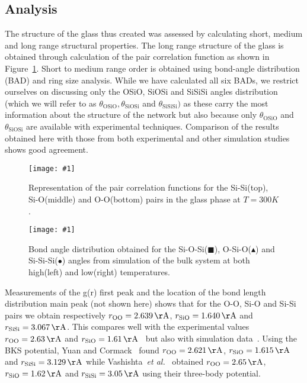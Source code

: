 \documentclass[aps,10pt,twocolumn]{revtex4}
\makeatletter
\newcommand{\etal}{\emph{et al.}\@\xspace}
\newcommand{\mrm}[1]{\ensuremath{\mathrm{#1}}\xspace}
\newlength{\picW}	%
\newcommand{\picA}{270}	%
\newcommand{\picL}[1]{\texttt{[image: \#1]}}
\newcommand{\angstrom}{\ensuremath{\mrm{\AA}}\xspace}
\makeatother
\begin{document}
\subsection{Analysis}

The structure of the glass thus created was assessed by calculating short, medium and long range
structural properties. The long range structure of the glass is obtained
through calculation of the pair correlation function as shown in Figure~\ref{fig:mkGlass_gr}.
Short to medium range order is obtained using bond-angle distribution (BAD) and ring size
analysis. 
While we have calculated all six BADs, we restrict ourselves on
discussing only the OSiO, SiOSi and SiSiSi angles distribution (which we will refer to as
$\theta_\mrm{OSiO},\theta_\mrm{SiOSi}$ and $\theta_\mrm{SiSiSi})$ as these carry the most
information about the structure of the network but also because only $\theta_\mrm{OSiO}$ and
$\theta_\mrm{SiOSi}$ are available with experimental techniques.  Comparison of the results
obtained here with those from both experimental and other simulation studies shows good
agreement.\\  

\picW=8cm
\begin{figure}
\picL{fig02.ps}
\caption{Representation of the pair correlation functions for the Si-Si(top), Si-O(middle) and
O-O(bottom) pairs in the glass phase at $T=300K$.}
\label{fig:mkGlass_gr}
\end{figure}

\picW=8cm
\begin{figure}
\picL{fig03.ps}
\caption{Bond angle distribution obtained for the Si-O-Si($\blacksquare$), O-Si-O($\blacktriangle$) and Si-Si-Si($\bullet$) angles from
simulation of the bulk system at both high(left) and low(right) temperatures.}
\end{figure}

Measurements of the g(r) first peak and the location of the bond length distribution main peak (not
shown here) shows that for the O-O, Si-O and Si-Si pairs we obtain respectively
$r_\mrm{OO}=2.639\,\angstrom$, $r_\mrm{SiO}=1.640\,\angstrom$ and $r_\mrm{SiSi}=3.067\,\angstrom$. 
This compares well with the experimental values 
$r_\mrm{OO}=2.63\,\angstrom$ and $r_\mrm{SiO}=1.61\,\angstrom$~\cite{MozziWarren69,JohnsonWright83} but also
with simulation data~\cite{YuanCormack01,VashishtaKalia90}. Using the BKS potential, Yuan and
Cormack~\cite{YuanCormack01} found $r_\mrm{OO}=2.621\,\angstrom$, $r_\mrm{SiO}=1.615\,\angstrom$ and
$r_\mrm{SiSi}=3.129\,\angstrom$ while Vashishta~\etal~\cite{VashishtaKalia90} obtained
$r_\mrm{OO}=2.65\,\angstrom$, $r_\mrm{SiO}=1.62\,\angstrom$ and $r_\mrm{SiSi}=3.05\,\angstrom$ using their
three-body potential.\\
\end{document}
